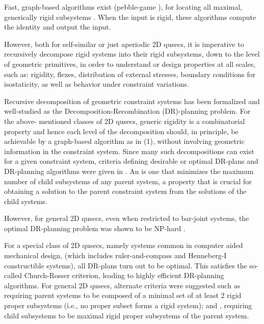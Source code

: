 \medskip\noindent
{}
Fast, graph-based algorithms exist (pebble-game \cite{Jacobs:1997:PG}), for
locating all maximal, generically rigid subsystems \uncited. When the
input is rigid, these algorithms compute the identity and output the
input.

However, both for self-similar or just aperiodic 2D qusecs, it is
imperative to recursively decompose rigid systems into their rigid
subsystems, down to the level of geometric primitives, in order to
understand or design properties at all scales, such as: rigidity,
flexes, distribution of external stresses, boundary conditions for
isostaticity, as well as behavior under constraint variations.

\medskip\noindent
{}
Recursive decomposition of geometric constraint systems has been
formalized \uncited and well-studied \uncited as the \dfn
{Decomposition-Recombination (DR)-planning} problem. For the above-
mentioned classes of 2D qusecs, generic rigidity is a combinatorial
property and hence each level of the decomposition should, in
principle, be achievable by a graph-based algorithm as in (1), without
involving geometric information in the constraint system. Since many
such decompositions can exist for a given constraint system, criteria
defining desirable or optimal DR-plans and DR-planning algorithms were
given in \uncited. An  is one that minimizes
the maximum number of child subsystems of any parent system, a
property that is crucial for obtaining a solution to the parent
constraint system from the solutions of the child systems.

However, for general 2D qusecs, even when restricted to bar-joint
systems, the optimal DR-planning problem was shown to be NP-hard
\uncited.

\medskip\noindent
{}
For a special class of 2D qusecs, namely 
systems \uncited common in computer aided mechanical design, (which
includes ruler-and-compass and Henneberg-I constructible systems), all
DR-plans turn out to be optimal. This satisfies the so-called \dfn
{Church-Rosser} criterion, leading to highly efficient DR-planning
algorithms. For general 2D qusecs, alternate criteria were suggested
such as  requiring parent systems to be
composed of a minimal set of at least 2 rigid proper subsystems (i.e.,
no proper subset forms a rigid system); and ,
requiring child subsystems to be maximal rigid proper subsystems of
the parent system.

